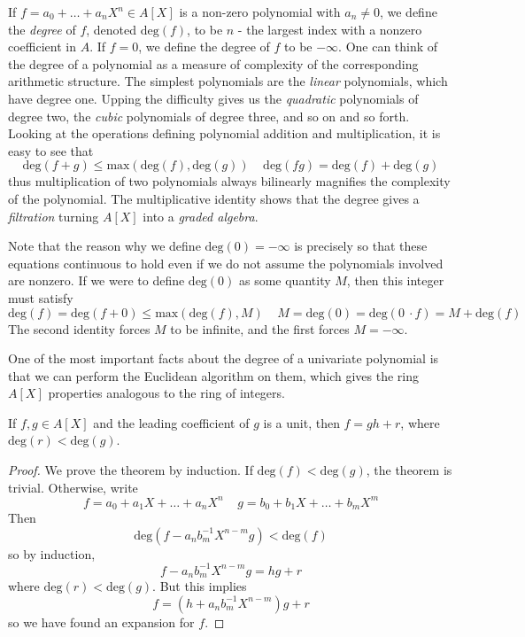 If $f = a_0 + \dots + a_nX^n \in A[X]$ is a non-zero polynomial with $a_n \neq 0$, we define the {\it degree} of $f$, denoted $\text{deg}(f)$, to be $n$ - the largest index with a nonzero coefficient in $A$. If $f = 0$, we define the degree of $f$ to be $-\infty$. One can think of the degree of a polynomial as a measure of complexity of the corresponding arithmetic structure. The simplest polynomials are the {\it linear} polynomials, which have degree one. Upping the difficulty gives us the {\it quadratic} polynomials of degree two, the {\it cubic} polynomials of degree three, and so on and so forth. Looking at the operations defining polynomial addition and multiplication, it is easy to see that
%
\[ \text{deg}(f + g) \leq \text{max}(\text{deg}(f), \text{deg}(g))\ \ \ \ \ \text{deg}(fg) = \text{deg}(f) + \text{deg}(g) \]
%
thus multiplication of two polynomials always bilinearly magnifies the complexity of the polynomial. The multiplicative identity shows that the degree gives a {\it filtration} turning $A[X]$ into a {\it graded algebra}.

\begin{remark}
	Note that the reason why we define $\text{deg}(0) = -\infty$ is precisely so that these equations continuous to hold even if we do not assume the polynomials involved are nonzero. If we were to define $\text{deg}(0)$ as some quantity $M$, then this integer must satisfy
	\[ \text{deg}(f) = \text{deg}(f + 0) \leq \text{max}(\text{deg}(f), M)\ \ \ \ \ M = \text{deg}(0) = \text{deg}(0\ \cdot f) = M + \text{deg}(f) \]
	The second identity forces $M$ to be infinite, and the first forces $M = -\infty$.
\end{remark}

One of the most important facts about the degree of a univariate polynomial is that we can perform the Euclidean algorithm on them, which gives the ring $A[X]$ properties analogous to the ring of integers.

\begin{theorem}
    If $f,g \in A[X]$ and the leading coefficient of $g$ is a unit, then $f = gh + r$, where $\text{deg}(r) < \text{deg}(g)$.
\end{theorem}
\begin{proof}
    We prove the theorem by induction. If $\text{deg}(f) < \text{deg}(g)$, the theorem is trivial. Otherwise, write
    \[ f = a_0 + a_1 X + \dots + a_n X^n\ \ \ \ \ g = b_0 + b_1 X + \dots + b_m X^m \]
    Then
    \[ \text{deg}(f - a_n b_m^{-1} X^{n - m} g) < \text{deg}(f) \]
    so by induction,
    \[ f - a_n b_m^{-1} X^{n-m} g = hg + r \]
    where $\text{deg}(r) < \text{deg}(g)$. But this implies
    \[ f = (h + a_n b_m^{-1} X^{n-m}) g + r \]
    so we have found an expansion for $f$.
\end{proof}

